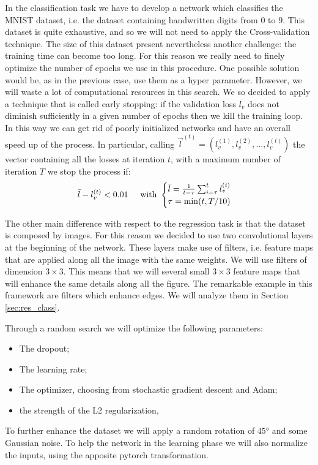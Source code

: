 In the classification task we have to develop a network which classifies the MNIST dataset, i.e. the dataset containing handwritten
digits from $0$ to $9$. This dataset is quite exhaustive, and so we will not need to apply the Cross-validation technique.
The size of this dataset present nevertheless another challenge: the training time can become too long. For this reason we really
need to finely optimize the number of epochs we use in this procedure. One possible solution would be, as in the previous case,
use them as a hyper parameter. However, we will waste a lot of computational resources in this search. We so decided to apply
a technique that is called early stopping: if the validation loss $l_{v}$ does not diminish sufficiently in a given number of
epochs then we kill the training loop. In this way we can get rid of poorly initialized networks and have an overall speed up
of the process. In particular, calling $\vec{l}^{(t)}=(l_{v}^{(1)},l_{v}^{(2)}, \dots, l_{v}^{(t)} )$ the vector containing all the losses at iteration $t$, with a maximum number
of iteration $T$ we stop the process if:
\begin{equation}
    \bar{l} - l_v^{(t)} < 0.01 \hspace{0.5 cm} \mbox{with } \begin{cases}\bar{l}= \frac{1}{t-\tau}\sum_{i=\tau}^t l_v^{(i)} \\ \tau=\min(t, T/10)
    \end{cases}
\end{equation}

The other main difference with respect to the regression task is that the dataset is composed by images. For this reason we 
decided to use two convolutional layers at the beginning of the network. These layers make use of filters, i.e. feature maps
that are applied along all the image with the same weights. We will use filters of dimension $3\times3$. This means that we
will several small $3\times3$ feature maps that will enhance the same details along all the figure. The remarkable example 
in this framework are filters which enhance edges. We will analyze them in Section \ref{sec:res_class}.

Through a random search we will optimize the following parameters:
\begin{itemize}
    \item The dropout;
    \item The learning rate;
    \item The optimizer, choosing from stochastic gradient descent and Adam;
    \item the strength of the L2 regularization,
\end{itemize}

To further enhance the dataset we will apply a random rotation of $45°$ and some Gaussian noise. To help the network in the learning
phase we will also normalize the inputs, using the apposite pytorch transformation.